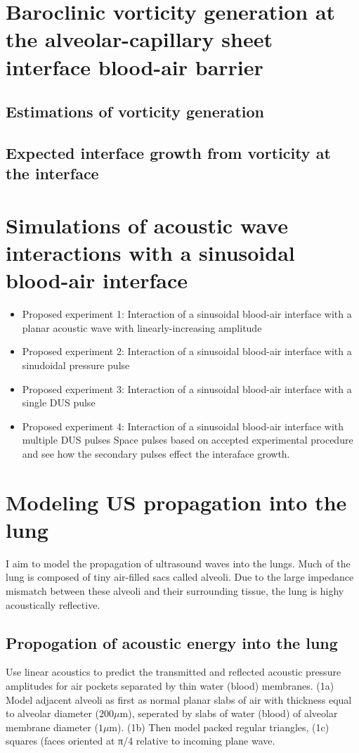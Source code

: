 \section{Baroclinic vorticity generation at the alveolar-capillary sheet interface blood-air barrier}
\subsection{Estimations of vorticity generation}
\subsection{Expected interface growth from vorticity at the interface }

\section{Simulations of acoustic wave interactions with a sinusoidal blood-air interface}
\begin{itemize}
\item Proposed experiment 1: Interaction of a sinusoidal blood-air interface with a planar acoustic wave with linearly-increasing amplitude
\item Proposed experiment 2: Interaction of a sinusoidal blood-air interface with a sinudoidal pressure pulse
\item Proposed experiment 3: Interaction of a sinusoidal blood-air interface with a single DUS pulse
\item Proposed experiment 4: Interaction of a sinusoidal blood-air interface with multiple DUS pulses
Space pulses based on accepted experimental procedure and see how the secondary pulses effect the interaface growth.
\end{itemize}

\section{Modeling US propagation into the lung}
I aim to model the propagation of ultrasound waves into the lungs.  Much of the lung is composed of tiny air-filled sacs called alveoli. Due to the large impedance mismatch between these alveoli and their surrounding tissue, the lung is highy acoustically reflective.

\subsection{Propogation of acoustic energy into the lung}
Use linear acoustics to predict the transmitted and reflected acoustic pressure amplitudes for air pockets separated by thin water (blood) membranes.  (1a) Model adjacent alveoli as first as normal planar slabs of air with thickness equal to alveolar diameter ($200\mu$m), seperated by slabs of water (blood) of alveolar membrane diameter ($1\mu$m).  (1b) Then model packed regular triangles, (1c) squares (faces oriented at π/4 relative to incoming plane wave.